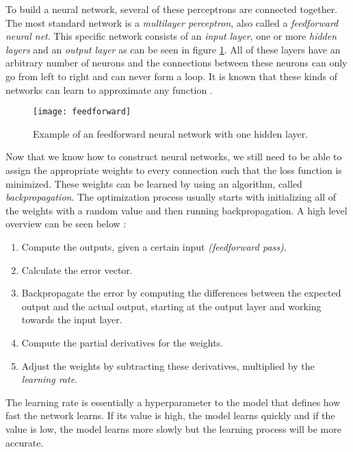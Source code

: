 To build a neural network, several of these perceptrons are connected together.
The most standard network is a \textit{multilayer perceptron}, also called a \textit{feedforward neural net}.
This specific network consists of an \textit{input layer}, one or more \textit{hidden layers} and an \textit{output layer} as can be seen in figure \ref{fig:feedforward}.
All of these layers have an arbitrary number of neurons and the connections between these neurons can only go from left to right and can never form a loop.
It is known that these kinds of networks can learn to approximate any function \cite{valiant2014learning}.

\begin{figure}[ht]
  \centering
  \texttt{[image: feedforward]}
  \caption{Example of an feedforward neural network with one hidden layer.}
  \label{fig:feedforward}
\end{figure}

Now that we know how to construct neural networks, we still need to be able to assign the appropriate weights to every connection such that the loss function is minimized.
These weights can be learned by using an algorithm, called \textit{backpropagation}.
The optimization process usually starts with initializing all of the weights with a random value and then running backpropagation.
A high level overview can be seen below \cite{nielsen_2017}:

\newpage

\begin{enumerate}
  \item Compute the outputs, given a certain input \textit{(feedforward pass)}.
  \item Calculate the error vector.
  \item Backpropagate the error by computing the differences between the expected output and the actual output, starting at the output layer and working towards the input layer.
  \item Compute the partial derivatives for the weights.
  \item Adjust the weights by subtracting these derivatives, multiplied by the \textit{learning rate}.
\end{enumerate}

The learning rate is essentially a hyperparameter to the model that defines how fast the network learns.
If its value is high, the model learns quickly and if the value is low, the model learns more slowly but the learning process will be more accurate.

